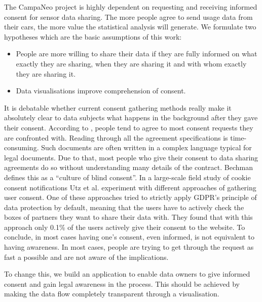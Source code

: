 \documentclass[../paper.tex]{subfiles}
\begin{document}
  The CampaNeo project is highly dependent on requesting and receiving informed
  consent for sensor data sharing. The more people agree to send usage data from
  their cars, the more value the statistical analysis will generate. We
  formulate two hypotheses which are the basic assumptions of this work:

  \begin{itemize}
    \item People are more willing to share their data if they are fully informed
          on what exactly they are sharing, when they are sharing it and with
          whom exactly they are sharing it.
    \item Data visualisations improve comprehension of consent.
  \end{itemize}

  It is debatable whether current consent gathering methods really make it
  absolutely clear to data subjects what happens in the background after they
  gave their consent. According to \cite{Borgesisus_informed_consent_2015}, people
  tend to agree to most consent requests they are confronted with.
  Reading through all the agreement specifications is time-consuming. Such
  documents are often written in a complex language typical for legal documents.
  Due to that, most people who give their consent to data sharing agreements do so
  without understanding many details of the contract. Bechman \cite{Bechmann2014}
  defines this as a “culture of blind consent”.
  In a large-scale field study of cookie consent notifications Utz et al. \cite{} experiment with different approaches of gathering user consent.
  One of these approaches tried to strictly apply GDPR's principle of data protection by default, meaning that the users have to actively check the boxes of partners they want to share their data with.
  They found that with this approach only 0.1\% of the users actively give their consent to the website.  
  To conclude, in most cases having
  one’s consent, even informed, is not equivalent to having awareness.
  In most cases, people are trying to get through the request as fast a possible and are not aware of the implications.

  To change this, we build an application to enable data owners to give informed
  consent and gain legal awareness in the process. This should be achieved by
  making the data flow completely transparent through a visualisation.


\end{document}
